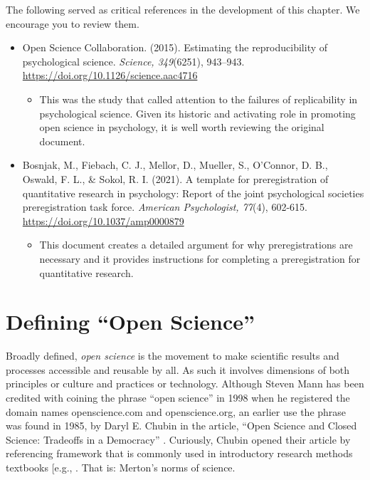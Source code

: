 \documentclass[
  11pt,
]{book}
\providecommand{\tightlist}{%
  \setlength{\itemsep}{0pt}\setlength{\parskip}{0pt}}
\begin{document}
The following served as critical references in the development of this chapter. We encourage you to review them.

\begin{itemize}
\tightlist
\item
  Open Science Collaboration. (2015). Estimating the reproducibility of psychological science. \emph{Science, 349}(6251), 943--943. \url{https://doi.org/10.1126/science.aac4716}

  \begin{itemize}
  \tightlist
  \item
    This was the study that called attention to the failures of replicability in psychological science. Given its historic and activating role in promoting open science in psychology, it is well worth reviewing the original document.
  \end{itemize}
\item
  Bosnjak, M., Fiebach, C. J., Mellor, D., Mueller, S., O'Connor, D. B., Oswald, F. L., \& Sokol, R. I. (2021). A template for preregistration of quantitative research in psychology: Report of the joint psychological societies preregistration task force. \emph{American Psychologist, 77}(4), 602-615. \url{https://doi.org/10.1037/amp0000879}

  \begin{itemize}
  \tightlist
  \item
    This document creates a detailed argument for why preregistrations are necessary and it provides instructions for completing a preregistration for quantitative research.
  \end{itemize}
\end{itemize}

\section{Defining ``Open Science''}\label{defining-open-science}

Broadly defined, \emph{open science} is the movement to make scientific results and processes accessible and reusable by all. As such it involves dimensions of both principles or culture and practices or technology. Although Steven Mann has been credited with coining the phrase ``open science'' in 1998 when he registered the domain names openscience.com and openscience.org, an earlier use the phrase was found in 1985, by Daryl E. Chubin in the article, ``Open Science and Closed Science: Tradeoffs in a Democracy'' \citep{noauthor_open_2022}. Curiously, Chubin opened their article by referencing framework that is commonly used in introductory research methods textbooks {[}e.g., \citet{krathwohl_methods_2009}. That is: Merton's norms of science.
\end{document}
